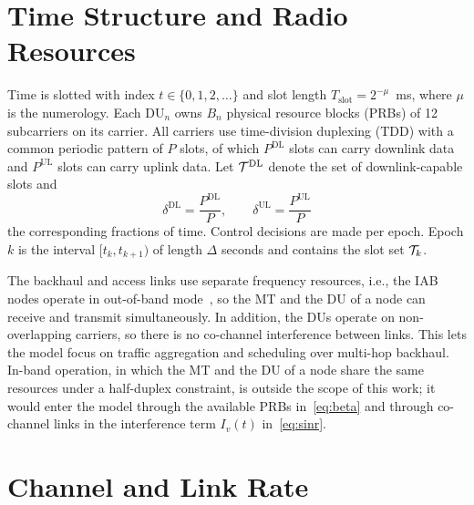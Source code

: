 \begin{EnChapter}
\section{Time Structure and Radio Resources}
\label{subsec:resource}

Time is slotted with index $t \in \{0,1,2,\dots\}$ and slot length
$T_{\mathrm{slot}} = 2^{-\mu}$~ms, where $\mu$ is the numerology. Each DU$_n$ owns
$B_n$ physical resource blocks (PRBs) of 12 subcarriers on its carrier. All carriers
use time-division duplexing (TDD) with a common periodic pattern of $P$ slots, of
which $P^{\mathrm{DL}}$ slots can carry downlink data and $P^{\mathrm{UL}}$ slots
can carry uplink data. Let $\mathcal{T}^{\mathrm{DL}}$ denote the set of downlink-capable
slots and
\begin{equation}
  \delta^{\mathrm{DL}} = \frac{P^{\mathrm{DL}}}{P}, \qquad
  \delta^{\mathrm{UL}} = \frac{P^{\mathrm{UL}}}{P}
\end{equation}
the corresponding fractions of time. Control decisions are made per epoch. Epoch
$k$ is the interval $[t_k, t_{k+1})$ of length $\Delta$ seconds and contains the
slot set $\mathcal{T}_k$.

\begin{assumption}
\label{ass:orthogonal}
The backhaul and access links use separate frequency resources, i.e., the IAB nodes
operate in out-of-band mode~\cite{topcu2025oranIAB,moro2023openIAB}, so the MT
and the DU of a node can receive and transmit simultaneously. In addition, the DUs operate
on non-overlapping carriers, so there is no co-channel interference between links.
This lets the model focus on traffic aggregation and scheduling over multi-hop
backhaul. In-band operation, in which the MT and the DU of a node share the same
resources under a half-duplex constraint, is outside the scope of this work; it
would enter the model through the available PRBs in~\eqref{eq:beta} and through
co-channel links in the interference term $I_v(t)$ in~\eqref{eq:sinr}.
\end{assumption}

\section{Channel and Link Rate}
\label{subsec:rate}


\end{EnChapter}
